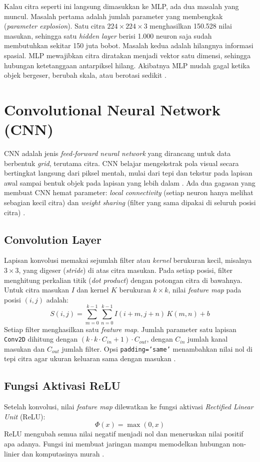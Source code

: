 \documentclass[a4paper,oneside,12pt]{report}
\begin{document}
Kalau citra seperti ini langsung dimasukkan ke MLP, ada dua masalah yang muncul. Masalah pertama adalah jumlah parameter yang membengkak (\textit{parameter explosion}). Satu citra $224 \times 224 \times 3$ menghasilkan 150.528 nilai masukan, sehingga satu \textit{hidden layer} berisi 1.000 neuron saja sudah membutuhkan sekitar 150 juta bobot. Masalah kedua adalah hilangnya informasi spasial. MLP mewajibkan citra diratakan menjadi vektor satu dimensi, sehingga hubungan ketetanggaan antarpiksel hilang. Akibatnya MLP mudah gagal ketika objek bergeser, berubah skala, atau berotasi sedikit \cite{lecun1998}.

\section{Convolutional Neural Network (CNN)}
CNN adalah jenis \textit{feed-forward neural network} yang dirancang untuk data berbentuk \textit{grid}, terutama citra. CNN belajar mengekstrak pola visual secara bertingkat langsung dari piksel mentah, mulai dari tepi dan tekstur pada lapisan awal sampai bentuk objek pada lapisan yang lebih dalam \cite{oshea2015}. Ada dua gagasan yang membuat CNN hemat parameter: \textit{local connectivity} (setiap neuron hanya melihat sebagian kecil citra) dan \textit{weight sharing} (filter yang sama dipakai di seluruh posisi citra) \cite{lecun1998}.

\subsection{Convolution Layer}
Lapisan konvolusi memakai sejumlah filter atau \textit{kernel} berukuran kecil, misalnya $3 \times 3$, yang digeser (\textit{stride}) di atas citra masukan. Pada setiap posisi, filter menghitung perkalian titik (\textit{dot product}) dengan potongan citra di bawahnya. Untuk citra masukan $I$ dan kernel $K$ berukuran $k \times k$, nilai \textit{feature map} pada posisi $(i, j)$ adalah:
\begin{equation}
	S(i, j) = \sum_{m=0}^{k-1} \sum_{n=0}^{k-1} I(i+m, j+n)\, K(m, n) + b
\end{equation}
Setiap filter menghasilkan satu \textit{feature map}. Jumlah parameter satu lapisan \texttt{Conv2D} dihitung dengan $(k \cdot k \cdot C_{in} + 1) \cdot C_{out}$, dengan $C_{in}$ jumlah kanal masukan dan $C_{out}$ jumlah filter. Opsi \texttt{padding='same'} menambahkan nilai nol di tepi citra agar ukuran keluaran sama dengan masukan \cite{keras-conv2d}.

\subsection{Fungsi Aktivasi ReLU}
Setelah konvolusi, nilai \textit{feature map} dilewatkan ke fungsi aktivasi \textit{Rectified Linear Unit} (ReLU):
\begin{equation}
	\Phi(x) = \max(0, x)
\end{equation}
ReLU mengubah semua nilai negatif menjadi nol dan meneruskan nilai positif apa adanya. Fungsi ini membuat jaringan mampu memodelkan hubungan non-linier dan komputasinya murah \cite{krizhevsky2012}.
\end{document}
